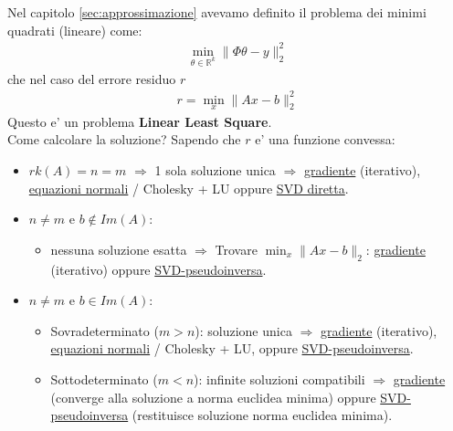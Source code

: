 \documentclass[a4paper,12pt]{article}
\begin{document}
Nel capitolo \ref{sec:approssimazione} avevamo definito il problema dei minimi quadrati (lineare) come:
\begin{align*}
    \min_{\theta \in \mathbb{R}^k} \| \Phi \theta - y \|_2^2
\end{align*}
che nel caso del errore residuo $r$
\begin{align*}
    r = \min_x \| Ax - b \|_2^2
\end{align*}
Questo e' un problema \textbf{Linear Least Square}. \\
Come calcolare la soluzione? Sapendo che $r$ e' una funzione convessa:
\begin{itemize}
    \item $rk(A) = n = m$ $\Rightarrow$ 1 sola soluzione unica $\Rightarrow$ \hyperref[sec:met_grad]{gradiente} (iterativo), \hyperref[sec:min_quad]{equazioni normali} / Cholesky + LU oppure \hyperref[sec:svd]{SVD diretta}.
    \item $n \neq m$ e $b \not\in Im(A)$:
    \begin{itemize}
        \item nessuna soluzione esatta $\Rightarrow$ Trovare $\min_x \|Ax-b\|_2$: \hyperref[sec:met_grad]{gradiente} (iterativo) oppure \hyperref[sec:svd_pseudo]{SVD-pseudoinversa}.
    \end{itemize}
    \item $n \neq m$ e $b \in Im(A)$:
    \begin{itemize}
        \item Sovradeterminato ($m > n$): soluzione unica $\Rightarrow$ \hyperref[sec:met_grad]{gradiente} (iterativo), \hyperref[sec:min_quad]{equazioni normali} / Cholesky + LU, oppure \hyperref[sec:svd_pseudo]{SVD-pseudoinversa}.
        \item Sottodeterminato ($m < n$): infinite soluzioni compatibili $\Rightarrow$ \hyperref[sec:met_grad]{gradiente} (converge alla soluzione a norma euclidea minima) oppure \hyperref[sec:svd_pseudo]{SVD-pseudoinversa} (restituisce soluzione norma euclidea minima).
    \end{itemize}
\end{itemize}
\end{document}
